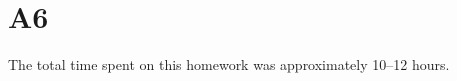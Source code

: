 \documentclass{article}
\begin{document}
\section*{A6}

The total time spent on this homework was approximately 10–12 hours.
\end{document}
